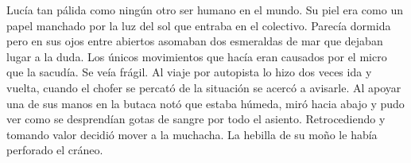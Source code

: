 \vspace*{1cm}

Lucía tan pálida como ningún otro ser humano en el mundo. Su piel era como
un papel manchado por la luz del sol que entraba en el colectivo. Parecía dormida
pero en sus ojos entre abiertos asomaban dos esmeraldas de mar que dejaban 
lugar a la duda. Los únicos movimientos que hacía eran causados por el micro
que la sacudía. Se veía frágil. Al viaje por autopista lo hizo dos veces ida y vuelta,
cuando el chofer se percató de la situación se acercó a avisarle. Al apoyar una de
sus manos en la butaca notó que estaba húmeda, miró hacia abajo y pudo ver como
se desprendían gotas de sangre por todo el asiento. Retrocediendo y tomando valor
decidió mover a la muchacha. La hebilla de su moño le había perforado el cráneo.

